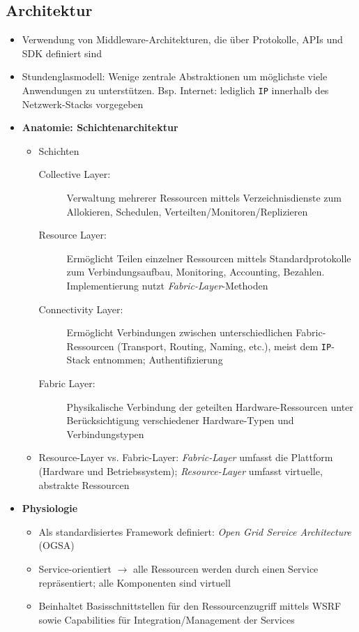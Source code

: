 \subsection{Architektur}
\begin{itemize}
	\item Verwendung von Middleware-Architekturen, die über Protokolle, APIs und SDK definiert sind
	\item Stundenglasmodell: Wenige zentrale Abstraktionen um möglichste viele Anwendungen zu unterstützen. Bsp. Internet: lediglich \texttt{IP} innerhalb des Netzwerk-Stacks vorgegeben
	\item \textbf{Anatomie: Schichtenarchitektur}
	\begin{itemize}
		\item Schichten
		\begin{description}
			\item[Collective Layer:] Verwaltung mehrerer Ressourcen mittels Verzeichnisdienste zum Allokieren, Schedulen, Verteilten/Monitoren/Replizieren
			\item[Resource Layer:] Ermöglicht Teilen einzelner Ressourcen mittels Standardprotokolle zum Verbindungsaufbau, Monitoring, Accounting, Bezahlen. Implementierung nutzt \textit{Fabric-Layer}-Methoden
			\item[Connectivity Layer:] Ermöglicht Verbindungen zwischen unterschiedlichen Fabric-Ressourcen (Transport, Routing, Naming, etc.), meist dem \texttt{IP}-Stack entnommen; Authentifizierung
			\item[Fabric Layer:] Physikalische Verbindung der geteilten Hardware-Ressourcen unter Berücksichtigung verschiedener Hardware-Typen und Verbindungstypen
		\end{description}
		\item Resource-Layer vs. Fabric-Layer: \textit{Fabric-Layer} umfasst die Plattform (Hardware und Betriebssystem); \textit{Resource-Layer} umfasst virtuelle, abstrakte Ressourcen
	\end{itemize}
	\item \textbf{Physiologie}
	\begin{itemize}
		\item Als standardisiertes Framework definiert: \textit{Open Grid Service Architecture} (OGSA)
		\item Service-orientiert \(\rightarrow\) alle Ressourcen werden durch einen Service repräsentiert; alle Komponenten sind virtuell
		\item Beinhaltet Basisschnittstellen für den Ressourcenzugriff mittels WSRF sowie Capabilities für Integration/Management der Services

\end{itemize}
\end{itemize}
